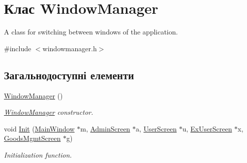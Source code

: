 \hypertarget{classWindowManager}{\section{Клас Window\-Manager}
\label{classWindowManager}
}


A class for switching between windows of the application.  




{\ttfamily \#include $<$windowmanager.\-h$>$}

\subsection*{Загальнодоступні елементи}
\begin{DoxyCompactItemize}
\item 
\hypertarget{classWindowManager_a3a283b34c19aaa20296befaabad4d29b}{\hyperlink{classWindowManager_a3a283b34c19aaa20296befaabad4d29b}{Window\-Manager} ()}\label{classWindowManager_a3a283b34c19aaa20296befaabad4d29b}

\begin{DoxyCompactList}\small\item\em \hyperlink{classWindowManager}{Window\-Manager} constructor. \end{DoxyCompactList}\item 
void \hyperlink{classWindowManager_a57acbed2b942f979ea6a096cdfca4a3e}{Init} (\hyperlink{classMainWindow}{Main\-Window} $\ast$m, \hyperlink{classAdminScreen}{Admin\-Screen} $\ast$a, \hyperlink{classUserScreen}{User\-Screen} $\ast$u, \hyperlink{classExUserScreen}{Ex\-User\-Screen} $\ast$x, \hyperlink{classGoodsMgmtScreen}{Goods\-Mgmt\-Screen} $\ast$g)
\begin{DoxyCompactList}\small\item\em Initialization function. \end{DoxyCompactList}\end{DoxyCompactItemize}
